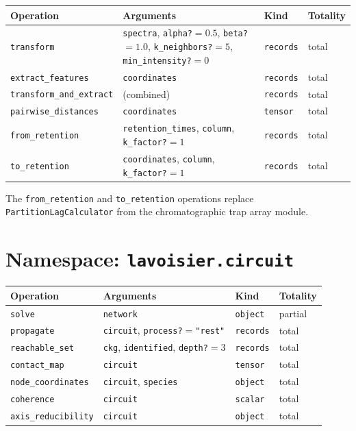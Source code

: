 \documentclass[11pt,a4paper]{article}
\theoremstyle{planstyle}
\theoremstyle{definition}
\theoremstyle{remark}
\newcommand{\shk}[1]{\texttt{#1}}
\begin{document}
\begin{longtable}{@{}p{3.8cm}p{5.5cm}p{1.8cm}p{1.5cm}@{}}
\toprule
\textbf{Operation} & \textbf{Arguments} & \textbf{Kind} & \textbf{Totality} \\
\midrule
\endhead
\shk{transform} & \shk{spectra}, \shk{alpha?}$=0.5$, \shk{beta?}$=1.0$,
  \shk{k\_neighbors?}$=5$, \shk{min\_intensity?}$=0$ &
  \shk{records} & total \\
\shk{extract\_features} & \shk{coordinates} & \shk{records} & total \\
\shk{transform\_and\_extract} & (combined) & \shk{records} & total \\
\shk{pairwise\_distances} & \shk{coordinates} & \shk{tensor} & total \\
\shk{from\_retention} & \shk{retention\_times}, \shk{column}, \shk{k\_factor?}$=1$ &
  \shk{records} & total \\
\shk{to\_retention} & \shk{coordinates}, \shk{column}, \shk{k\_factor?}$=1$ &
  \shk{records} & total \\
\bottomrule
\end{longtable}

The \shk{from\_retention} and \shk{to\_retention} operations replace
\shk{PartitionLagCalculator} from the chromatographic trap array module.

\section{Namespace: \texttt{lavoisier.circuit}}
\label{sec:ns-circuit}

\begin{longtable}{@{}p{3.8cm}p{5.5cm}p{1.8cm}p{1.5cm}@{}}
\toprule
\textbf{Operation} & \textbf{Arguments} & \textbf{Kind} & \textbf{Totality} \\
\midrule
\endhead
\shk{solve} & \shk{network} & \shk{object} & partial \\
\shk{propagate} & \shk{circuit}, \shk{process?}$=$\shk{"rest"} &
  \shk{records} & total \\
\shk{reachable\_set} & \shk{ckg}, \shk{identified}, \shk{depth?}$=3$ &
  \shk{records} & total \\
\shk{contact\_map} & \shk{circuit} & \shk{tensor} & total \\
\shk{node\_coordinates} & \shk{circuit}, \shk{species} & \shk{object} & total \\
\shk{coherence} & \shk{circuit} & \shk{scalar} & total \\
\shk{axis\_reducibility} & \shk{circuit} & \shk{object} & total \\
\bottomrule
\end{longtable}
\end{document}
